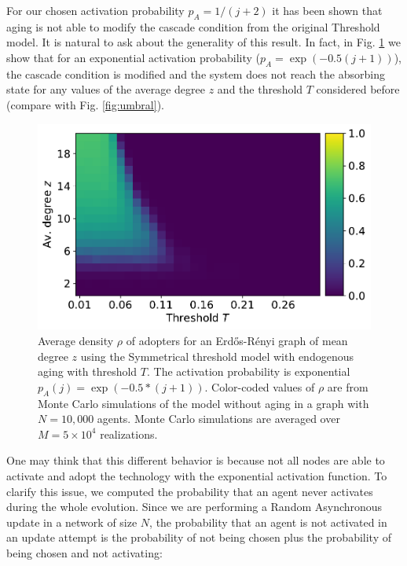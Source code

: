 For our chosen activation probability $p_A = 1/(j+2)$ it has been shown that aging is not able to modify the cascade condition from the original Threshold model. It is natural to ask about the generality of this result. In fact, in Fig. \ref{fig:exp_umbral} we show that for an exponential activation probability ($p_A = \exp{(-0.5(j+1))}$), the cascade condition is modified and the system does not reach the absorbing state for any values of the average degree $z$ and the threshold $T$ considered before (compare with Fig. \ref{fig:umbral}).

\begin{figure}[]
\includegraphics[width=1\columnwidth]{Figs/Appendix1_Threshold/cascade_exp.pdf}
\caption{\label{fig:exp_umbral} Average density $\rho$ of adopters for an Erd\H{o}s-R\'enyi graph of mean degree $z$ using the Symmetrical threshold model with endogenous aging with threshold $T$. The activation probability is exponential $p_A(j) = \exp{(-0.5*(j+1))}$. Color-coded values of $\rho$ are from Monte Carlo simulations of the model without aging in a graph with $N = 10,000$ agents.  Monte Carlo simulations are averaged over $M = 5 \times 10^4$ realizations.}
\end{figure}

One may think that this different behavior is because not all nodes are able to activate and adopt the technology with the exponential activation function. To clarify this issue, we computed the probability that an agent never activates during the whole evolution. Since we are performing a Random Asynchronous update in a network of size $N$, the probability that an agent is not activated in an update attempt is the probability of not being chosen plus the probability of being chosen and not activating:

